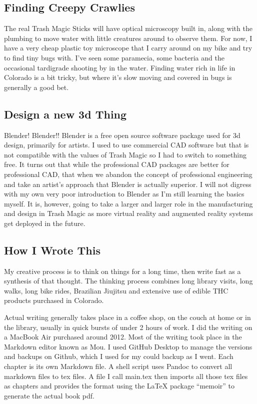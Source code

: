 \subsection{Finding Creepy Crawlies}\label{finding-creepy-crawlies}

The real Trash Magic Sticks will have optical microscopy built in, along
with the plumbing to move water with little creatures around to observe
them. For now, I have a very cheap plastic toy microscope that I carry
around on my bike and try to find tiny bugs with. I've seen some
paramecia, some bacteria and the occasional tardigrade shooting by in
the water. Finding water rich in life in Colorado is a bit tricky, but
where it's slow moving and covered in bugs is generally a good bet.

\subsection{Design a new 3d Thing}\label{design-a-new-3d-thing}

Blender! Blender!! Blender is a free open source software package used
for 3d design, primarily for artists. I used to use commercial CAD
software but that is not compatible with the values of Trash Magic so I
had to switch to something free. It turns out that while the
professional CAD packages are better for professional CAD, that when we
abandon the concept of professional engineering and take an artist's
approach that Blender is actually superior. I will not digress with my
own very poor introduction to Blender as I'm still learning the basics
myself. It is, however, going to take a larger and larger role in the
manufacturing and design in Trash Magic as more virtual reality and
augmented reality systems get deployed in the future.

\subsection{How I Wrote This}\label{how-i-wrote-this}

My creative process is to think on things for a long time, then write
fast as a synthesis of that thought. The thinking process combines long
library visits, long walks, long bike rides, Brazilian Jiujitsu and
extensive use of edible THC products purchased in Colorado.

Actual writing generally takes place in a coffee shop, on the couch at
home or in the library, usually in quick bursts of under 2 hours of
work. I did the writing on a MacBook Air purchased around 2012. Most of
the writing took place in the Markdown editor known as Mou. I used
GitHub Desktop to manage the versions and backups on Github, which I
used for my could backup as I went. Each chapter is its own Markdown
file. A shell script uses Pandoc to convert all markdown files to tex
files. A file I call main.tex then imports all those tex files as
chapters and provides the format using the LaTeX package ``memoir'' to
generate the actual book pdf.

